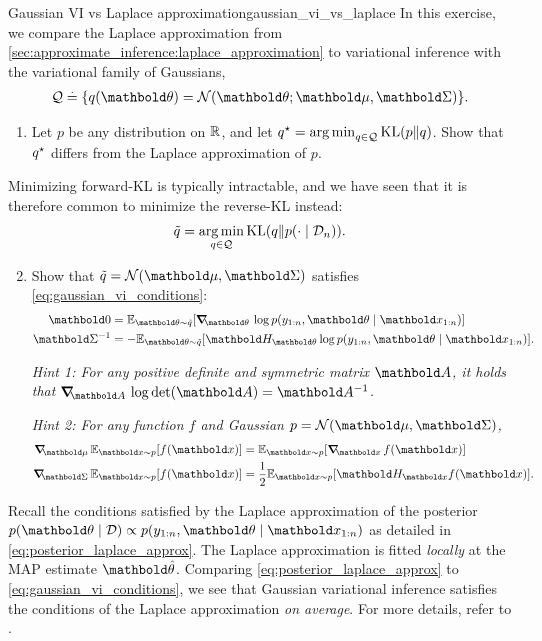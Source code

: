 \begin{nexercise}{Gaussian VI vs Laplace approximation}{gaussian_vi_vs_laplace}
  In this exercise, we compare the Laplace approximation from \cref{sec:approximate_inference:laplace_approximation} to variational inference with the variational family of Gaussians, \begin{align*}
    \spQ \defeq \braces*{q(\vtheta) = \N[\vtheta]{\vmu}{\mSigma}}.
  \end{align*}
  \begin{enumerate}
    \item Let $p$ be any distribution on $\mathbb{R}$, and let $\opt{q} = \argmin_{q \in \spQ} \KL{p}{q}$.
    Show that $q^\star$ differs from the Laplace approximation of $p$.
  \end{enumerate}

  Minimizing forward-KL is typically intractable, and we have seen that it is therefore common to minimize the reverse-KL instead: \begin{align*}
    \tilde{q} = \argmin_{q \in \spQ} \KL{q}{p(\cdot \mid \spD_n)}.
  \end{align*}
  \begin{enumerate}
    \setcounter{enumi}{1}
    \item Show that $\tilde{q} = \N{\vmu}{\mSigma}$ satisfies \cref{eq:gaussian_vi_conditions}: \begin{align*}
      \vzero &= \E[\vtheta \sim \tilde{q}]{\grad_{\vtheta} \log p(y_{1:n}, \vtheta \mid \vx_{1:n})} \\
      \inv{\mSigma} &= - \E[\vtheta \sim \tilde{q}]{\hes_{\vtheta} \log p(y_{1:n}, \vtheta \mid \vx_{1:n})}.
    \end{align*}

    \textit{Hint 1: For any positive definite and symmetric matrix $\mA$, it holds that $\grad_{\mA} \log\det{\mA} = \inv{\mA}$.}

    \textit{Hint 2: For any function $f$ and Gaussian $p = \N{\vmu}{\mSigma}$, \begin{align}\begin{split}
      \grad_{\vmu} \E[\vx \sim p]{f(\vx)} &= \E[\vx \sim p]{\grad_{\vx} f(\vx)} \\
      \grad_{\mSigma} \E[\vx \sim p]{f(\vx)} &= \frac{1}{2} \E[\vx \sim p]{\hes_{\vx} f(\vx)}.
    \end{split}\label{eq:gradient_of_gaussian_parameters}\end{align}}
  \end{enumerate}

  Recall the conditions satisfied by the Laplace approximation of the posterior $p(\vtheta \mid \spD) \propto p(y_{1:n}, \vtheta \mid \vx_{1:n})$ as detailed in \cref{eq:posterior_laplace_approx}.
  The Laplace approximation is fitted \emph{locally} at the MAP estimate $\vthetahat$.
  Comparing \cref{eq:posterior_laplace_approx} to \cref{eq:gaussian_vi_conditions}, we see that Gaussian variational inference satisfies the conditions of the Laplace approximation \emph{on average}.
  For more details, refer to \cite{opper2009variational}.
\end{nexercise}

